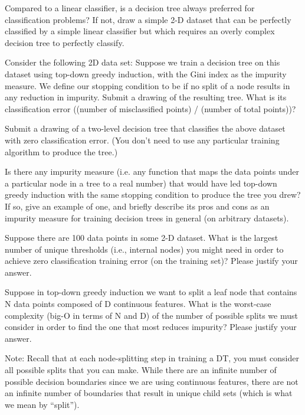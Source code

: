 \problem[4]
Compared to a linear classifier, is a decision tree always preferred for classification problems? If not, draw a simple 2-D dataset that can be perfectly classified by a simple linear classifier but which requires an overly complex decision tree to perfectly classify.

\problem[15]
Consider the following 2D data set:
\subproblem[5] Suppose we train a decision tree on this dataset using top-down greedy induction, with the Gini index as
the impurity measure. We define our stopping condition to be if no split of a node
results in any reduction in impurity. Submit a drawing of the resulting tree.  What is its classification error ((number of misclassified points) / (number of total points))?

\subproblem[5] Submit a drawing of a two-level decision tree that classifies the above dataset with zero classification error.  (You don't need to use any particular training algorithm to produce the tree.)

Is there any impurity measure (i.e. any function that maps the data points under a particular node in a tree to a real number) that would have led top-down greedy induction with the same stopping condition to produce the tree you drew?  If so, give an example of one, and briefly describe its pros and cons as an impurity measure for training decision trees in general (on arbitrary datasets). 

\subproblem[5] Suppose there are 100 data points in some 2-D dataset. What is the largest number of unique thresholds (i.e., internal nodes) you might need in order to achieve zero classification training error (on the training set)? Please
justify your answer.

\problem[4] Suppose in top-down greedy induction we want to split a leaf node that contains N data points composed of
D continuous features. What is the worst-case
complexity (big-O in terms of N and D) of the number of possible splits we must consider in order to find the one that most reduces impurity? Please justify your answer.

Note: Recall that at each node-splitting step in training a DT, you must consider all possible splits that you can make. While there are an infinite number of possible decision boundaries since we are using continuous features, there are not an infinite number of boundaries that result in unique child sets (which is what we mean by ``split'').


